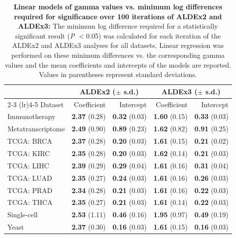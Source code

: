 \documentclass{article}
\begin{document}
\begin{table}[H]
    \caption{\textbf{Linear models of gamma values vs. minimum log differences required for significance over 100 iterations of ALDEx2 and ALDEx3:} The minimum log difference required for a statistically significant result (\textit{P} $<$0.05) was calculated for each iteration of the ALDEx2 and ALDEx3 analyses for all datasets. Linear regression was performed on these minimum differences vs. the corresponding gamma values and the mean coefficients and intercepts of the models are reported. Values in parentheses represent standard deviations.}
    \centering
    \begin{tabular}{lrrrr}
         \toprule
         & \multicolumn{2}{c}{ALDEx2 ($\pm$ s.d.)} & \multicolumn{2}{c}{ALDEx3 ($\pm$ s.d.)}\\
         \cmidrule(lr){2-3} \cmidrule(lr){4-5}
         Dataset &  Coefficient & Intercept & Coefficient & Intercept\\
         \midrule
         Immunotherapy & \textbf{2.37} (0.28) & \textbf{0.32} (0.03) & \textbf{1.60} (0.15) & \textbf{0.33} (0.03) \\
         Metatranscriptome & \textbf{2.49} (0.90) & \textbf{0.89} (0.23) & \textbf{1.62} (0.82) & \textbf{0.91} (0.25) \\
         TCGA: BRCA & \textbf{2.37} (0.28) & \textbf{0.20} (0.03) & \textbf{1.61} (0.15) & \textbf{0.21} (0.02) \\
         TCGA: KIRC & \textbf{2.35} (0.28) & \textbf{0.20} (0.03) & \textbf{1.62} (0.14) & \textbf{0.21} (0.03) \\
         TCGA: LIHC & \textbf{2.39} (0.29) & \textbf{0.29} (0.04) & \textbf{1.61} (0.16) & \textbf{0.31} (0.04) \\
         TCGA: LUAD & \textbf{2.35} (0.27) & \textbf{0.24} (0.03) & \textbf{1.61} (0.16) & \textbf{0.26} (0.03) \\
         TCGA: PRAD & \textbf{2.34} (0.28) & \textbf{0.21} (0.03) & \textbf{1.61} (0.16) & \textbf{0.22} (0.03) \\
         TCGA: THCA & \textbf{2.35} (0.27) & \textbf{0.21} (0.03) & \textbf{1.61} (0.14) & \textbf{0.22} (0.03) \\
         Single-cell & \textbf{2.53} (1.11) & \textbf{0.46} (0.16) & \textbf{1.95} (0.97) & \textbf{0.49} (0.19) \\
         Yeast & \textbf{2.37} (0.30) & \textbf{0.16} (0.03) & \textbf{1.61} (0.15) & \textbf{0.16} (0.03) \\
         \bottomrule
    \end{tabular}
    \label{tab:regression}
\end{table}
\end{document}
